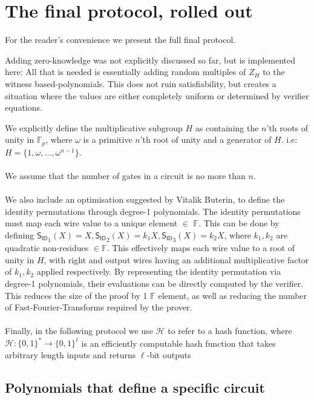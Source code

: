 \documentclass[11pt]{article} %
\newcommand{\F}{\ensuremath{\mathbb F}\xspace}
\newcommand{\hash}{\ensuremath{\mathcal{H}}\xspace}
\newcommand{\idpoly}{\ensuremath{\mathsf{S_{ID}}}\xspace}
\begin{document}
 
 
 \section{The final protocol, rolled out}\label{sec:finalconst}
 For the reader's convenience we present the full final protocol.

 Adding zero-knowledge was not explicitly discussed so far, but is implemented here:
 All that is needed is essentially adding random multiples of $Z_{H}$ to the witness based-polynomials. This does not ruin satisfiability, but creates a situation where the values are either completely uniform or determined by verifier equations.
 
 

 We explicitly define the multiplicative subgroup $H$ as containing the $n$'th roots of unity in $\F_p$, where $\omega$ is a primitive $n$'th root of unity and a generator of $H$. i.e: $H = \{1, \omega, \ldots, \omega^{n-1}\}$.
 \\
 \\
 We assume that the number of gates in a circuit is no more than $n$.
 \\
 \\
 We also include an optimisation suggested by Vitalik Buterin, to define the identity permutations through degree-1 polynomials. The identity permutations must map each wire value to a unique element $\in$ \F. This can be done by defining $\idpoly_1(X) = X, \idpoly_2(X) = k_1X, \idpoly_3(X) = k_2X$, where $k_1, k_2$ are quadratic non-residues $\in \F$.
 This effectively maps each wire value to a root of unity in $H$, with right and output wires having an additional multiplicative factor of $k_1, k_2$ applied respectively.
 By representing the identity permutation via degree-1 polynomials, their evaluations can be directly computed by the verifier. This reduces the size of the proof by 1 \F element, as well as reducing the number of Fast-Fourier-Transforms required by the prover.
\\
\\
Finally, in the following protocol we use \hash to refer to a hash function, where $\hash:\{0,1\}^*\to \{0,1\}^{\ell}$ is an efficiently computable hash function that takes arbitrary length inputs and returns $\ell$-bit outputs  

\subsection{Polynomials that define a specific circuit}
\end{document}
